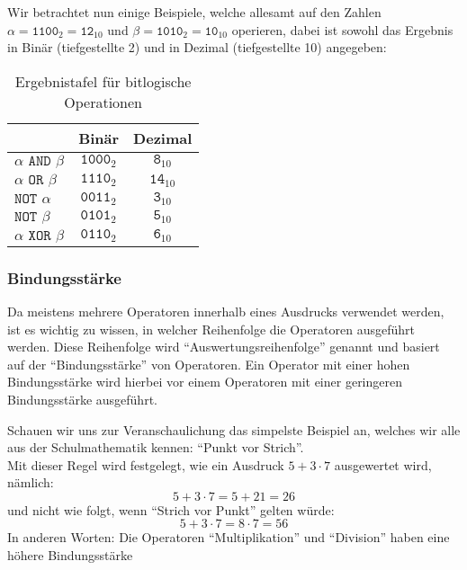 		Wir betrachtet nun einige Beispiele, welche allesamt auf den Zahlen \( \alpha = \texttt{1100} _ 2 = \texttt{12} _ {10} \) und \( \beta = \texttt{1010} _ 2 = \texttt{10} _ {10} \) operieren, dabei ist sowohl das Ergebnis in Binär (tiefgestellte 2) und in Dezimal (tiefgestellte 10) angegeben:
		\begin{table}[H]
			\centering
			\begin{tabular}{l | c c}
				                                  & Binär                   & Dezimal                  \\ \hline
				\( \alpha \texttt{ AND } \beta \) & \( \texttt{1000} _ 2 \) & \( \texttt{8} _ {10} \)  \\
				\( \alpha \texttt{ OR } \beta \)  & \( \texttt{1110} _ 2 \) & \( \texttt{14} _ {10} \) \\
				\( \texttt{NOT } \alpha \)        & \( \texttt{0011} _ 2 \) & \( \texttt{3} _ {10} \)  \\
				\( \texttt{NOT } \beta \)         & \( \texttt{0101} _ 2 \) & \( \texttt{5} _ {10} \)  \\
				\( \alpha \texttt{ XOR } \beta \) & \( \texttt{0110} _ 2 \) & \( \texttt{6} _ {10} \)
			\end{tabular}
			\caption{Ergebnistafel für bitlogische Operationen}
		\end{table}
	
	\subsubsection{Bindungsstärke}
		Da meistens mehrere Operatoren innerhalb eines Ausdrucks verwendet werden, ist es wichtig zu wissen, in welcher Reihenfolge die Operatoren ausgeführt werden. Diese Reihenfolge wird \enquote{Auswertungsreihenfolge} genannt und basiert auf der \enquote{Bindungsstärke} von Operatoren. Ein Operator mit einer hohen Bindungsstärke wird hierbei vor einem Operatoren mit einer geringeren Bindungsstärke ausgeführt.
		
		Schauen wir uns zur Veranschaulichung das simpelste Beispiel an, welches wir alle aus der Schulmathematik kennen: \enquote{Punkt vor Strich}. \\
		Mit dieser Regel wird festgelegt, wie ein Ausdruck $ 5 + 3 \cdot 7 $ ausgewertet wird, nämlich:
		\begin{equation*}
			5 + 3 \cdot 7 = 5 + 21 = 26
		\end{equation*}
		und nicht wie folgt, wenn \enquote{Strich vor Punkt} gelten würde:
		\begin{equation*}
			5 + 3 \cdot 7 = 8 \cdot 7 = 56
		\end{equation*}
		In anderen Worten: Die Operatoren \enquote{Multiplikation} und \enquote{Division} haben eine höhere Bindungsstärke

